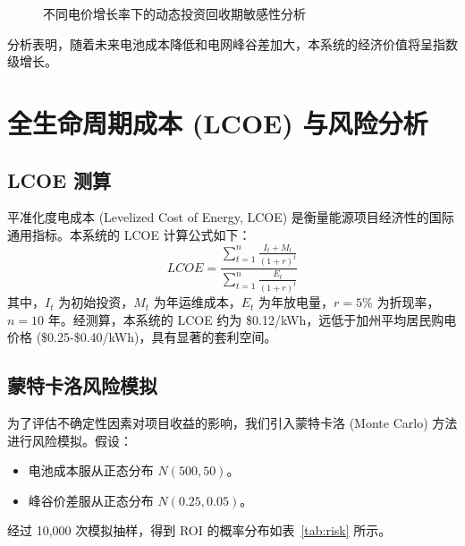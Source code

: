 \begin{figure}[htbp]
    \centering
    \caption{不同电价增长率下的动态投资回收期敏感性分析}
    \label{fig:dynamic_payback}
\end{figure}

分析表明，随着未来电池成本降低和电网峰谷差加大，本系统的经济价值将呈指数级增长。

\section{全生命周期成本 (LCOE) 与风险分析}

\subsection{LCOE 测算}
平准化度电成本 (Levelized Cost of Energy, LCOE) 是衡量能源项目经济性的国际通用指标\cite{lcoe2023azard}。本系统的 LCOE 计算公式如下：
\begin{equation}
    LCOE = \frac{\sum_{t=1}^{n} \frac{I_t + M_t}{(1+r)^t}}{\sum_{t=1}^{n} \frac{E_t}{(1+r)^t}}
\end{equation}
其中，$I_t$ 为初始投资，$M_t$ 为年运维成本，$E_t$ 为年放电量，$r=5\%$ 为折现率，$n=10$ 年。经测算，本系统的 LCOE 约为 \$0.12/kWh，远低于加州平均居民购电价格 (\$0.25-\$0.40/kWh)，具有显著的套利空间。

\subsection{蒙特卡洛风险模拟}
为了评估不确定性因素对项目收益的影响，我们引入蒙特卡洛 (Monte Carlo) 方法进行风险模拟。假设：
\begin{itemize}
    \item 电池成本服从正态分布 $N(500, 50)$。
    \item 峰谷价差服从正态分布 $N(0.25, 0.05)$。
\end{itemize}
经过 10,000 次模拟抽样，得到 ROI 的概率分布如表~\ref{tab:risk} 所示。

